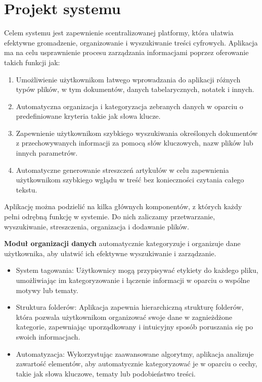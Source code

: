 \documentclass[12pt,a4paper,twoside]{article}
\begin{document}
\section{Projekt systemu}
Celem systemu jest zapewnienie scentralizowanej platformy, która ułatwia efektywne gromadzenie, organizowanie i wyszukiwanie treści cyfrowych. Aplikacja ma na celu usprawnienie procesu zarządzania informacjami poprzez oferowanie takich funkcji jak:
\begin{enumerate}
	\item Umożliwienie użytkownikom łatwego wprowadzania do aplikacji różnych typów plików, w tym dokumentów, danych tabelarycznych, notatek i innych.
	\item Automatyczna organizacja i kategoryzacja zebranych danych w oparciu o predefiniowane kryteria takie jak słowa klucze.
	\item Zapewnienie użytkownikom szybkiego wyszukiwania określonych dokumentów z przechowywanych informacji za pomocą słów kluczowych, nazw plików lub innych parametrów.
	\item Automatyczne generowanie streszczeń artykułów w celu zapewnienia użytkownikom szybkiego wglądu w treść bez konieczności czytania całego tekstu.
\end{enumerate}\par
Aplikację można podzielić na kilka głównych komponentów, z których każdy pełni odrębną funkcję w systemie. Do nich zaliczamy przetwarzanie, wyszukiwanie, streszczenia, organizacja i dodawanie plików.\par
\textbf{Moduł organizacji danych} automatycznie kategoryzuje i organizuje dane użytkownika, aby ułatwić ich efektywne wyszukiwanie i zarządzanie.
\begin{itemize}
	\item System tagowania: Użytkownicy mogą przypisywać etykiety do każdego pliku, umożliwiając im kategoryzowanie i łączenie informacji w oparciu o wspólne motywy lub tematy.
	\item Struktura folderów: Aplikacja zapewnia hierarchiczną strukturę folderów, która pozwala użytkownikom organizować swoje dane w zagnieżdżone kategorie, zapewniając uporządkowany i intuicyjny sposób poruszania się po swoich informacjach.
	\item Automatyzacja: Wykorzystując zaawansowane algorytmy, aplikacja analizuje zawartość elementów, aby automatycznie kategoryzować je w oparciu o cechy, takie jak słowa kluczowe, tematy lub podobieństwo treści.
\end{itemize}\par
\end{document}

